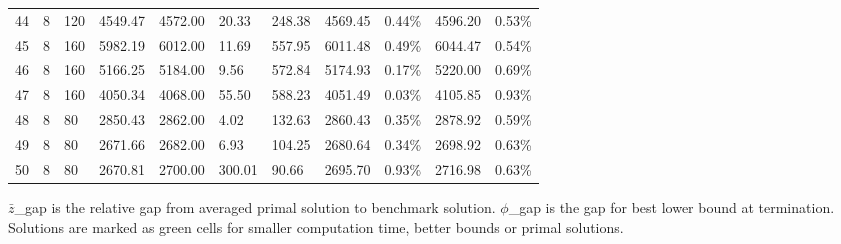 \documentclass[../main]{subfiles}
\begin{document}
\begin{longtable}{l|ll|lll|lllll}
   44                  & 8                               & 120                    & 4549.47             & 4572.00  & 20.33         & 248.38                     & \cellcolor{green!25}4569.45 & 0.44\%  & 4596.20 & 0.53\% \\
   45                  & 8                               & 160                    & 5982.19             & 6012.00  & 11.69         & 557.95                     & \cellcolor{green!25}6011.48 & 0.49\%  & 6044.47 & 0.54\% \\
   46                  & 8                               & 160                    & 5166.25             & 5184.00  & 9.56          & 572.84                     & \cellcolor{green!25}5174.93 & 0.17\%  & 5220.00 & 0.69\% \\
   47                  & 8                               & 160                    & 4050.34             & 4068.00  & 55.50         & 588.23                     & \cellcolor{green!25}4051.49 & 0.03\%  & 4105.85 & 0.93\% \\
   48                  & 8                               & 80                     & 2850.43             & 2862.00  & 4.02          & 132.63                     & \cellcolor{green!25}2860.43 & 0.35\%  & 2878.92 & 0.59\% \\
   49                  & 8                               & 80                     & 2671.66             & 2682.00  & 6.93          & 104.25                     & \cellcolor{green!25}2680.64 & 0.34\%  & 2698.92 & 0.63\% \\
   50                  & 8                               & 80                     & 2670.81             & 2700.00  & 300.01        & \cellcolor{green!25}90.66  & \cellcolor{green!25}2695.70 & 0.93\%  & 2716.98 & 0.63\% \\
   \bottomrule
\end{longtable}

\small
$\bar z$\_gap is the relative gap from averaged primal solution to benchmark solution.
$\phi$\_gap is the gap for best lower bound at termination. Solutions are marked as green cells for smaller computation time, better bounds or primal solutions.

\normalsize
\end{document}
